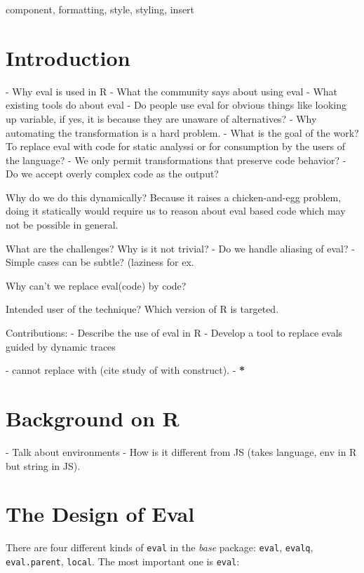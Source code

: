 \documentclass[conference]{IEEEtran}
\begin{document}
\begin{IEEEkeywords}
component, formatting, style, styling, insert
\end{IEEEkeywords}

\section{Introduction}
- Why eval is used in R
- What the community says about using eval
- What existing tools do about eval
- Do people use eval for obvious things like looking up variable, if yes, it is
because they are unaware of alternatives?
- Why automating the transformation is a hard problem.
- What is the goal of the work? To replace eval with code for static analyssi or
for consumption by the users of the language?
- We only permit transformations that preserve code behavior?
- Do we accept overly complex code as the output?

Why do we do this dynamically? Because it raises a chicken-and-egg problem,
doing it statically would require us to reason about eval based code which may
not be possible in general.


What are the challenges? Why is it not trivial?
- Do we handle aliasing of eval?
- Simple cases can be subtle? (laziness for ex.

Why can't we replace eval(code) by code?

Intended user of the technique? Which version of R is targeted.

Contributions:
- Describe the use of eval in R
- Develop a tool to replace evals guided by dynamic traces


- cannot replace with (cite study of with construct).
- 
\textbf{*}

\section{Background on R}
- Talk about environments
- How is it different from JS (takes language, env in R but string in JS).

\section{The Design of Eval}

There are four different kinds of \texttt{eval} in the \emph{base} package:  \texttt{eval}, \texttt{evalq}, \texttt{eval.parent},  \texttt{local}.
The most important one is \texttt{eval}:
\end{document}
